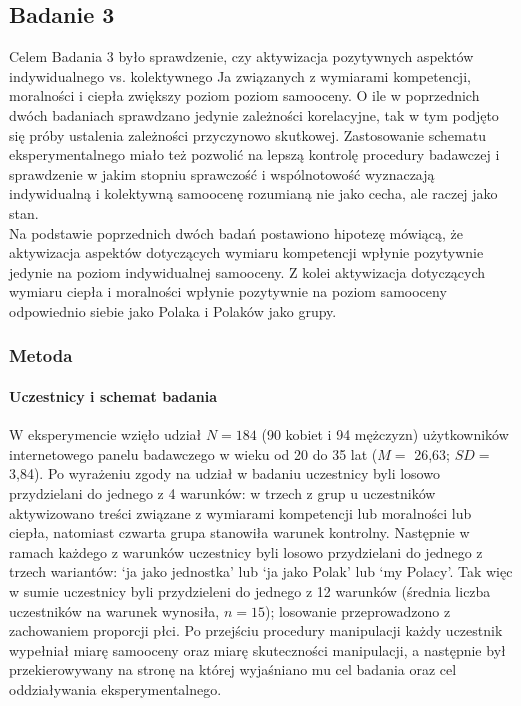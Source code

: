 \documentclass[man]{apa6}
\begin{document}
\subsection{Badanie 3}
Celem Badania 3 było sprawdzenie, czy aktywizacja pozytywnych aspektów indywidualnego vs. kolektywnego Ja związanych z wymiarami kompetencji, moralności i ciepła zwiększy poziom poziom samooceny. O ile w poprzednich dwóch badaniach sprawdzano jedynie zależności korelacyjne, tak w tym podjęto się próby ustalenia zależności przyczynowo skutkowej. Zastosowanie schematu eksperymentalnego miało też pozwolić na lepszą kontrolę procedury badawczej i sprawdzenie w jakim stopniu sprawczość i wspólnotowość wyznaczają indywidualną i kolektywną samoocenę rozumianą nie jako cecha, ale raczej jako stan.\\

Na podstawie poprzednich dwóch badań postawiono hipotezę mówiącą, że aktywizacja aspektów dotyczących wymiaru kompetencji wpłynie pozytywnie jedynie na poziom indywidualnej samooceny. Z kolei aktywizacja dotyczących wymiaru ciepła i moralności wpłynie pozytywnie na poziom samooceny odpowiednio siebie jako Polaka i Polaków jako grupy. \\

\subsubsection{Metoda}

\paragraph{Uczestnicy i schemat badania}
W eksperymencie wzięło udział $N = 184$ (90 kobiet i 94 mężczyzn) użytkowników internetowego panelu badawczego w wieku od 20 do 35 lat ($M =$ 26,63; $SD =$ 3,84). Po wyrażeniu zgody na udział w badaniu uczestnicy byli losowo przydzielani do jednego z 4 warunków: w trzech z grup u uczestników aktywizowano treści związane z wymiarami kompetencji lub moralności lub ciepła, natomiast czwarta grupa stanowiła warunek kontrolny. Następnie w ramach każdego z warunków uczestnicy byli losowo przydzielani do jednego z trzech wariantów: `ja jako jednostka' lub `ja jako Polak' lub `my Polacy'. Tak więc w sumie uczestnicy byli przydzieleni do jednego z 12 warunków (średnia liczba uczestników na warunek wynosiła, $n = 15$); losowanie przeprowadzono z zachowaniem proporcji płci. Po przejściu procedury manipulacji każdy uczestnik wypełniał miarę samooceny oraz miarę skuteczności manipulacji, a następnie był przekierowywany na stronę na której wyjaśniano mu cel badania oraz cel oddziaływania eksperymentalnego.
\end{document}
